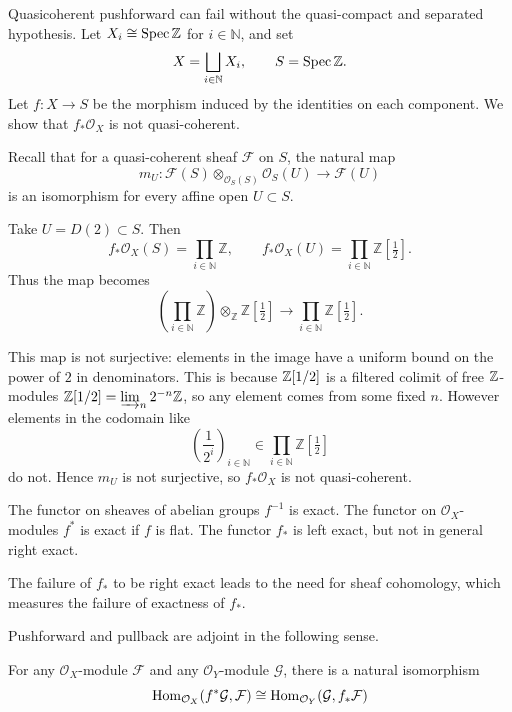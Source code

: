 \documentclass[12pt]{article}
\begin{document}
\begin{example}
    Quasicoherent pushforward can fail without the quasi-compact and separated hypothesis.
    Let $X_i \cong \operatorname{Spec} \mathbb{Z}$ for $i \in \mathbb{N}$, and set
    \[
        X = \bigsqcup_{i\in\mathbb{N}} X_i, \qquad S = \operatorname{Spec} \mathbb{Z}.
    \]
    Let $f:X \to S$ be the morphism induced by the identities on each component. We show that $f_*\mathcal{O}_X$ is not quasi-coherent.

    Recall that for a quasi-coherent sheaf $\mathcal{F}$ on $S$, the natural map
    \[
        m_U:\mathcal{F}(S)\otimes_{\mathcal{O}_S(S)} \mathcal{O}_S(U) \to \mathcal{F}(U)
    \]
    is an isomorphism for every affine open $U \subset S$.

    Take $U = D(2) \subset S$. Then
    \[
        f_*\mathcal{O}_X(S) = \prod_{i\in\mathbb{N}} \mathbb{Z},
        \qquad
        f_*\mathcal{O}_X(U) = \prod_{i\in\mathbb{N}} \mathbb{Z}\!\left[\tfrac{1}{2}\right].
    \]
    Thus the map becomes
    \[
        \left(\prod_{i\in\mathbb{N}} \mathbb{Z}\right)\otimes_{\mathbb{Z}} \mathbb{Z}\!\left[\tfrac{1}{2}\right]
        \longrightarrow
        \prod_{i\in\mathbb{N}} \mathbb{Z}\!\left[\tfrac{1}{2}\right].
    \]

    This map is not surjective: elements in the image have a uniform bound on the power of $2$ in denominators. This is because $\mathbb{Z}[1/2]$ is a filtered colimit of free $\mathbb{Z}$-modules $\mathbb{Z}[1/2] = \varinjlim_n 2^{-n}\mathbb{Z}$, so any element comes from some fixed $n$.
    However elements in the codomain like
    \[
        \left(\frac{1}{2^i}\right)_{i\in\mathbb{N}} \in \prod_{i\in\mathbb{N}} \mathbb{Z}\!\left[\tfrac{1}{2}\right]
    \]
    do not. Hence $m_U$ is not surjective, so $f_*\mathcal{O}_X$ is not quasi-coherent.
\end{example}

\begin{proposition}
    The functor on sheaves of abelian groups $f^{-1}$ is exact.
    The functor on $\mathcal O_X$-modules $f^*$ is exact if $f$ is flat.
    The functor $f_*$ is left exact, but not in general right exact.
\end{proposition}
The failure of $f_*$ to be right exact leads to the need for sheaf cohomology, which measures the failure of exactness of $f_*$.

Pushforward and pullback are adjoint in the following sense.

\begin{proposition}
    For any $\mathcal O_X$-module $\mathcal F$ and any $\mathcal O_Y$-module $\mathcal G$, there is a natural isomorphism
    \[\operatorname{Hom}_{\mathcal O_X}(f^*\mathcal G,\mathcal F) \cong \operatorname{Hom}_{\mathcal O_Y}(\mathcal G,f_*\mathcal F)\]
\end{proposition}
\end{document}
